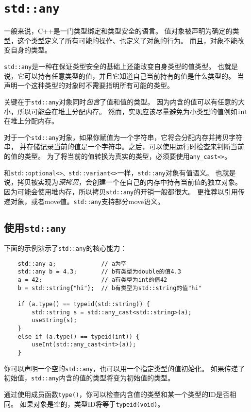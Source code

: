 \chapter{\texttt{std::any}}\label{ch17}
一般来说，C++是一门类型绑定和类型安全的语言。
值对象被声明为确定的类型，这个类型定义了所有可能的操作、也定义了对象的行为。
而且，对象不能改变自身的类型。

\texttt{std::any}是一种在保证类型安全的基础上还能改变自身类型的值类型。
也就是说，它可以持有任意类型的值，并且它知道自己当前持有的值是什么类型的。
当声明一个这种类型的对象时不需要指明所有可能的类型。

关键在于\texttt{std::any}对象同时\emph{包含}了值和值的类型。
因为内含的值可以有任意的大小，所以可能会在堆上分配内存。
然而，实现应该尽量避免为小类型的值例如\texttt{int}在堆上分配内存。

对于一个\texttt{std::any}对象，如果你赋值为一个字符串，它将会分配内存并拷贝字符串，
并存储记录当前的值是一个字符串。之后，可以使用运行时检查来判断当前的值的类型。
为了将当前的值转换为真实的类型，必须要使用\texttt{any\_cast<>}。

和\texttt{std::optional<>、std::variant<>}一样，\texttt{std::any}对象有值语义。
也就是说，拷贝被实现为\emph{深拷贝}，会创建一个在自己的内存中持有当前值的独立对象。
因为可能会使用堆内存，所以拷贝\texttt{std::any}的开销一般都很大。
更推荐以引用传递对象，或者move值。\texttt{std::any}支持部分move语义。


\section{使用\texttt{std::any}}
下面的示例演示了\texttt{std::any}的核心能力：
\begin{lstlisting}
    std::any a;             // a为空
    std::any b = 4.3;       // b有类型为double的值4.3
    a = 42;                 // a有类型为int的值42
    b = std::string{"hi"};  // b有类型为std::string的值"hi"

    if (a.type() == typeid(std::string)) {
        std::string s = std::any_cast<std::string>(a);
        useString(s);
    }
    else if (a.type() == typeid(int)) {
        useInt(std::any_cast<int>(a));
    }
\end{lstlisting}
你可以声明一个空的\texttt{std::any}，也可以用一个指定类型的值初始化。
如果传递了初始值，\texttt{std::any}内含的值的类型将变为初始值的类型。

通过使用成员函数\texttt{type()}，你可以检查内含值的类型和某一个类型的ID是否相同。
如果对象是空的，类型ID将等于\texttt{typeid(void)}。

